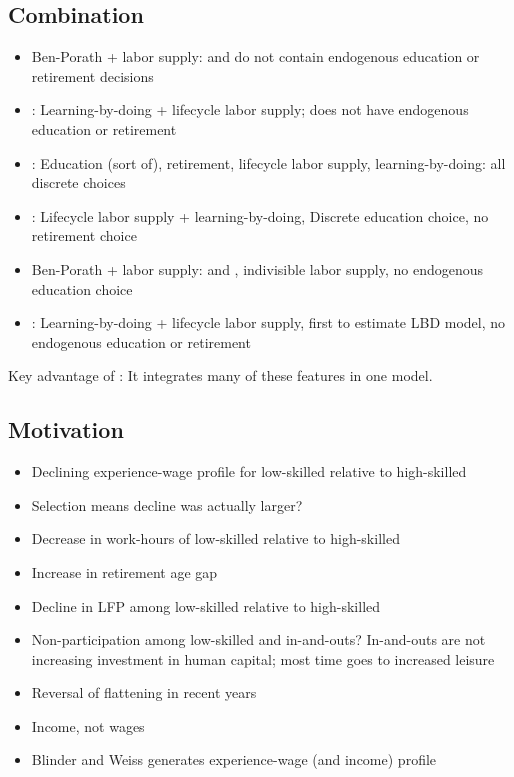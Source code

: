 \documentclass[12pt]{article}
\begin{document}
\subsection{Combination}
\begin{itemize}
    \item Ben-Porath + labor supply: \textcite{heckman_1976_lifecycle_human_capital_labor_supply} and \textcite{heckman_1976_estimate_human_capital_production_function} do not contain endogenous education or retirement decisions
    \item \textcite{imai_keane_2004_lifecycle_labor_supply_human_capital_accumulation}: Learning-by-doing + lifecycle labor supply; does not have endogenous education or retirement
    \item \textcite{keane_wolpin_1997_career_decisions_young_men}: Education (sort of), retirement, lifecycle labor supply, learning-by-doing: all discrete choices
    \item \textcite{blundell_costa-dias_meghir_shaw_2016_female_lifecycle_labor_supply_education_human_capital_welfare}: Lifecycle labor supply + learning-by-doing, Discrete education choice, no retirement choice
    \item Ben-Porath + labor supply: \textcite{manuelli_seshadri_shin_2012_lifetime_labor_supply_human_capital} and \textcite{fan_seshadri_taber_2012_lifetime_labor_supply_human_capital}, indivisible labor supply, no endogenous education choice
    \item \textcite{shaw_1989_lifecycle_labor_supply_human_capital}: Learning-by-doing + lifecycle labor supply, first to estimate LBD model, no endogenous education or retirement
\end{itemize}

Key advantage of \textcite{blinder_weiss_1976_lifecycle_human_capital_labor_supply_synthesis}: It integrates many of these features in one model.

\subsection{Motivation}
\begin{itemize}
    \item Declining experience-wage profile for low-skilled relative to high-skilled
    \item Selection means decline was actually larger?
    \item Decrease in work-hours of low-skilled relative to high-skilled
    \item Increase in retirement age gap
    \item Decline in LFP among low-skilled relative to high-skilled
    \item Non-participation among low-skilled and in-and-outs? In-and-outs are not increasing investment in human capital; most time goes to increased leisure
    \item Reversal of flattening in recent years
    \item Income, not wages
    \item Blinder and Weiss generates experience-wage (and income) profile
\end{itemize}
\end{document}
